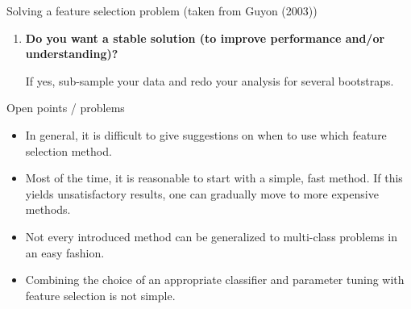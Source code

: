 \begin{vbframe}{Solving a feature selection problem (taken from Guyon (2003))}
\begin{enumerate}
  If yes, compare several feature selection methods, including your new idea, correlation coefficients, backward selection and embedded methods.
  Use linear and nonlinear predictors.
  Select the best approach via model selection.
  \item {\bf Do you want a stable solution (to improve performance and/or understanding)?}

  If yes, sub-sample your data and redo your analysis for several bootstraps.
\end{enumerate}

\end{vbframe}

\begin{vbframe}{Open points / problems}

\begin{itemize}
  \item In general, it is difficult to give suggestions on when to use which feature selection method.
  \item Most of the time, it is reasonable to start with a simple, fast method.
  If this yields unsatisfactory results, one can gradually move to more expensive methods.
  \item Not every introduced method can be generalized to multi-class problems in an easy fashion.
  \item Combining the choice of an appropriate classifier and parameter tuning with feature selection is not simple.
\end{itemize}

\end{vbframe}


\endlecture


